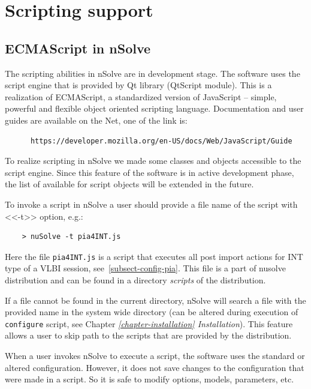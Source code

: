 \documentclass [10pt,letterpaper]{report}
\newcommand{\nuSolve}{\greektext n\latintext Solve}
\begin{document}
%
%
%
%
\chapter{Scripting support}
\label{chapter-scripting}


\section{ECMAScript in \nuSolve{}}
\label{section-scripting-intro}
The scripting abilities in \nuSolve{} are in development stage. The
software uses the script engine that is provided by Qt library (QtScript
module). This is a realization of ECMAScript, a standardized version
of JavaScript -- simple, powerful and flexible object oriented scripting
language. Documentation and user guides are available on the Net,
one of the link is:
\begin{verbatim}
      https://developer.mozilla.org/en-US/docs/Web/JavaScript/Guide
\end{verbatim}

To realize scripting in \nuSolve{} we made some classes and objects
accessible to the script engine. Since this feature of the software is
in active development phase, the list of available for script objects
will be extended in the future.

To invoke a script in \nuSolve{} a user should provide a file name of
the script with <<-t>> option, e.g.:
\begin{verbatim}
    > nuSolve -t pia4INT.js
\end{verbatim}
\noindent
Here the file {\tt pia4INT.js} is a script that executes all post import
actions for INT type of a VLBI session, see~\ref{subsect-config-pia}.
This file is a part of nusolve distribution and can be found in a
directory {\sl scripts} of the distribution.

If a file cannot be found in the current directory, \nuSolve{} will
search a file with the provided name in the system wide directory
(can be altered during execution of {\tt configure} script, see Chapter
\emph{\ref{chapter-installation} Installation}). This feature allows
a user to skip path to the scripts that are provided by the distribution.

When a user invokes \nuSolve{} to execute a script, the software uses the
standard or altered configuration. However, it does not save changes to
the configuration that were made in a script. So it is safe to modify
options, models, parameters, etc.
\end{document}
